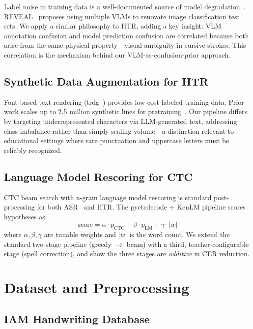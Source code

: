 \documentclass[conference]{IEEEtran}
\begin{document}
Label noise in training data is a well-documented source of model degradation~\cite{frenay2014}. REVEAL~\cite{jiang2025} proposes using multiple VLMs to renovate image classification test sets. We apply a similar philosophy to HTR, adding a key insight: VLM annotation confusion and model prediction confusion are correlated because both arise from the same physical property---visual ambiguity in cursive strokes. This correlation is the mechanism behind our VLM-as-confusion-prior approach.

\subsection{Synthetic Data Augmentation for HTR}

Font-based text rendering (trdg~\cite{belval2019}) provides low-cost labeled training data. Prior work scales up to 2.5 million synthetic lines for pretraining~\cite{luo2023}. Our pipeline differs by targeting underrepresented characters via LLM-generated text, addressing class imbalance rather than simply scaling volume---a distinction relevant to educational settings where rare punctuation and uppercase letters must be reliably recognized.

\subsection{Language Model Rescoring for CTC}

CTC beam search with n-gram language model rescoring is standard post-processing for both ASR~\cite{hannun2014} and HTR. The pyctcdecode + KenLM pipeline scores hypotheses as:
\begin{equation}
  \text{score} = \alpha \cdot p_{\text{CTC}} + \beta \cdot p_{\text{LM}} + \gamma \cdot |w|
\end{equation}
where $\alpha, \beta, \gamma$ are tunable weights and $|w|$ is the word count. We extend the standard two-stage pipeline (greedy $\to$ beam) with a third, teacher-configurable stage (spell correction), and show the three stages are \emph{additive} in CER reduction.

\section{Dataset and Preprocessing}

\subsection{IAM Handwriting Database}
\end{document}
